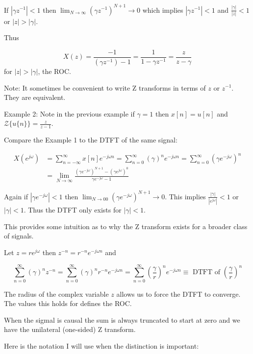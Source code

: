 \documentclass{article}
\begin{document}
If $\left|\gamma z^{-1}\right|<1$ then $\lim_{N \rightarrow \infty}\left(\gamma z^{-1}\right)^{N+1} \rightarrow 0$ which implies $\left|\gamma z^{-1}\right|<1$ and $\frac{|\gamma|}{|z|}<1$ or $|z|>|\gamma|$.

Thus

$$
X(z)=\frac{-1}{\left(\gamma z^{-1}\right) - 1}=\frac{1}{1-\gamma z^{-1}}=\frac{z}{z-\gamma}
$$
for $|z|>|\gamma|$, the ROC.

Note: It sometimes be convenient to write Z transforms in terms of $z$ or $z^{-1}$. They are equivalent.

Example 2: Note in the previous example if $\gamma=1$ then $x[n]=u[n]$ and $\mathcal{Z}\{u\{n\}\}=\frac{z}{z-1}$.

Compare the Example 1 to the DTFT of the same signal:

$$
\begin{aligned}
X\left(e^{j \omega}\right) &= \sum_{n=-\infty}^{\infty} x[n] e^{-j \omega n}=\sum_{n=0}^{\infty}(\gamma)^{n} e^{-j \omega n}=\sum_{n=0}^{\infty}\left(\gamma e^{-j \omega}\right)^{n} \\
& =\lim _{N \rightarrow \infty} \frac{\left(\gamma e^{-j \omega}\right)^{N+1}-\left(\gamma e^{j \omega}\right)^{0}}{\gamma e^{-j \omega}-1}
\end{aligned}
$$

Again if $\left|\gamma e^{-j \omega}\right|<1$ then $\lim _{N \rightarrow 00}\left(\gamma e^{-j \omega}\right)^{N+1} \rightarrow 0$. This implies
$\frac{|\gamma|}{\left|e^{j \omega}\right|}<1$ or $|\gamma|<1$. Thus the DTFT only exists for $|\gamma|<1$.

This provides some intuition as to why the Z transform exists for a broader class of signals.

Let $z=r e^{j \omega}$ then $z^{-n}=r^{-n} e^{-j \omega n}$ and

$$
\sum_{n=0}^{\infty}(\gamma)^{n} z^{-n}=\sum_{n=0}^{\infty}(\gamma)^{n} r^{-n} e^{-j \omega n}=\sum_{n=0}^{\infty}\left(\frac{\gamma}{r}\right)^{n} e^{-j \omega n} \equiv \text{ DTFT of } \left(\frac{\gamma}{r}\right)^{n}
$$

The radius of the complex variable $z$ allows us to force the DTFT to converge. The values this holds for defines the ROC.

When the sigmal is causal the sum is always truncated to start at zero and we have the unilateral (one-sided) Z transform.

Here is the notation I will use when the distinction is important:
\end{document}
